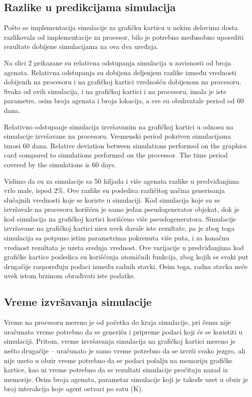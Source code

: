 \subsection{Razlike u predikcijama simulacija}

Pošto se implementacija simulacije za grafičku karticu u nekim delovima dosta razlikovala od implementacije za procesor, bilo je potrebno međusobno uporediti rezultate dobijene simulacijama na ova dva uređaja.

Na slici 2 prikazane su relativna odstupanja simulacija u zavisnosti od broja agenata. Relativna odstupanja su dobijena deljenjem razlike između vrednosti dobijenih na procesoru i na grafičkoj kartici vrednošću dobijenom na procesoru. Svaka od ovih simulacija, i na grafičkoj kartici i na procesoru, imala je iste parametre, osim broja agenata i broja lokacija, a sve su obuhvatale period od 60 dana.

    {Relativno odstupanje simulacija izvršavanim na grafičkoj kartici u odnosu na simulacije izvršavane na procesoru. Vremenski period pokriven simulacijama iznosi 60 dana.}
    {Relative deviation between simulations performed on the graphics card compared to simulations performed on the processor. The time period covered by the simulations is 60 days.}

Vidimo da su za simulacije sa 50 hiljada i više agenata razlike u predviđanjima vrlo male, ispod 2\%. Ove razlike su posledica različitog načina generisanja slučajnih vrednosti koje se koriste u simulaciji. Kod simulacija koje su se izvršavale na procesoru korišćen je samo jedan pseudogenerator objekat, dok je kod simulacija na grafičkoj kartici korišćeno više pseudogeneratora. Simulacije izvršavane na grafičkoj kartici nisu uvek davale iste rezultate, pa je zbog toga simulacija sa potpuno istim parametrima pokrenuta više puta, i za konačnu vrednost rezultata je uzeta srednja vrednost. Ove varijacije u predviđanjima kod grafičke kartice posledica su korišćenja atomičnih funkcija, zbog kojih se svaki put drugačije raspoređuju podaci između radnih stavki. Osim toga, radna stavka neće uvek istom brzinom obrađivati iste podatke.


\subsection{Vreme izvršavanja simulacije}

Vreme na procesoru mereno je od početka do kraja simulacije, pri čemu nije uračunato vreme potrebno da se generišu i pripreme podaci koji će se koristiti u simulaciji. Pritom, vreme izvršavanja simulacija na grafičkoj kartici mereno je nešto drugačije -- uračunato je samo vreme potrebno da se izvrši svako jezgro, ali nije uzeto u obzir vreme potrebno da se podaci pošalju na memoriju grafičke kartice, kao ni vreme potrebno da se rezultati simulacije pročitaju nazad iz memorije. Osim broja agenata, parametar simulacije koji je takođe uzet u obzir je broj interakcija koje agent ostvari po satu (K).

